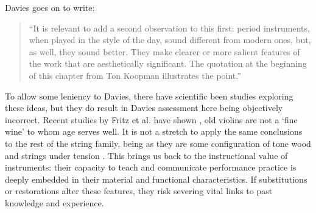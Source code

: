 Davies goes on to write:
\begin{quotation}
``It is relevant to add a second observation to this first: period instruments, when played in the style of the day, sound different from modern ones, but, as well, they sound better. They make clearer or more salient features of the work that are aesthetically significant. The quotation at the beginning of this chapter from Ton Koopman illustrates the point.''
\end{quotation}

To allow some leniency to Davies, there have scientific been studies exploring these ideas, but they do result in Davies assessment here being objectively incorrect.
Recent studies by Fritz et al. have shown \cite{fritz_player_2012, fritz_soloist_2014, fritz_listener_2017}, old violins are not a `fine wine' to whom age serves well. 
It is not a stretch to apply the same conclusions to the rest of the string family, being as they are some configuration of tone wood and strings under tension \cite{carcagno_guitar_2017}.
This brings us back to the instructional value of instruments: their capacity to teach and communicate performance practice is deeply embedded in their material and functional characteristics. If substitutions or restorations alter these features, they risk severing vital links to past knowledge and experience.



